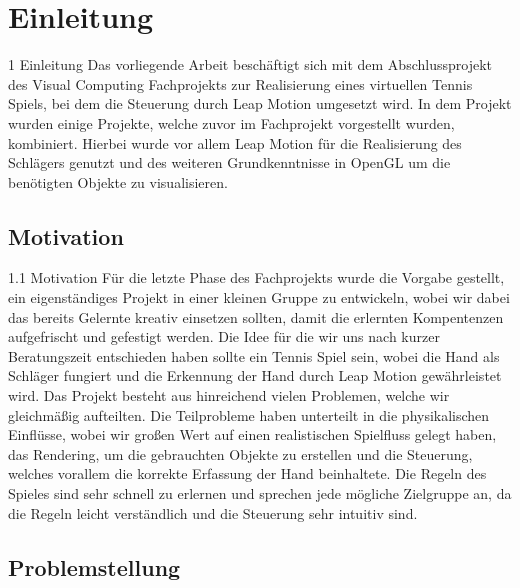 
\chapter{Einleitung}
\label{Einleitung}
1 Einleitung
Das vorliegende Arbeit beschäftigt sich mit dem Abschlussprojekt des Visual Computing Fachprojekts zur Realisierung eines virtuellen Tennis Spiels, bei dem 
die Steuerung durch Leap Motion umgesetzt wird.
In dem Projekt wurden einige Projekte, welche zuvor im Fachprojekt vorgestellt wurden, kombiniert. Hierbei wurde vor allem Leap Motion für die Realisierung des Schlägers genutzt und des weiteren
Grundkenntnisse in OpenGL um die benötigten Objekte zu visualisieren.




\section{Motivation}
\label{Motivation_und_Hintergrund}
%
1.1 Motivation 
Für die letzte Phase des Fachprojekts wurde die Vorgabe gestellt, ein eigenständiges Projekt in einer kleinen Gruppe zu entwickeln, wobei wir dabei
das bereits Gelernte kreativ einsetzen sollten, damit die erlernten Kompentenzen aufgefrischt und gefestigt werden.
Die Idee für die wir uns nach kurzer Beratungszeit entschieden haben sollte ein Tennis Spiel sein, wobei die Hand als Schläger fungiert und die Erkennung der Hand
durch Leap Motion gewährleistet wird. 
Das Projekt besteht aus hinreichend vielen Problemen, welche wir gleichmäßig aufteilten. Die Teilprobleme haben unterteilt in die physikalischen Einflüsse, wobei
wir großen Wert auf einen realistischen Spielfluss gelegt haben, das Rendering, um die gebrauchten Objekte zu erstellen und die Steuerung, welches vorallem die korrekte Erfassung der Hand
beinhaltete. 
Die Regeln des Spieles sind sehr schnell zu erlernen und sprechen jede mögliche Zielgruppe an, da die Regeln leicht verständlich und die Steuerung sehr intuitiv sind. %




\newpage
\section{Problemstellung}
\label{Aufbau_der_Arbeit}
%

